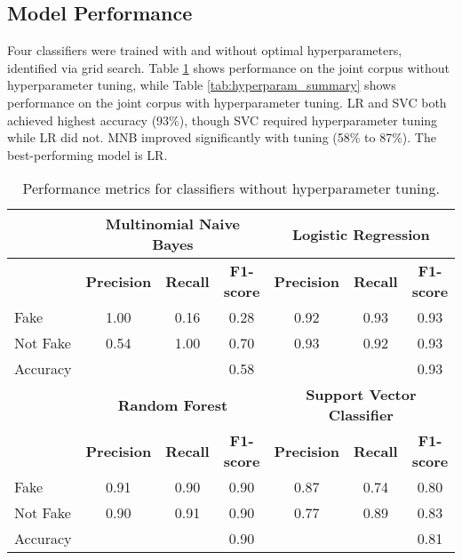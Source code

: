 \documentclass[conference]{IEEEtran}
\begin{document}
\subsection{Model Performance}
Four classifiers were trained with and without optimal hyperparameters, identified via grid search. Table \ref{tab:no_hyperparam_summary} shows performance on the joint corpus without hyperparameter tuning, while Table \ref{tab:hyperparam_summary} shows performance on the joint corpus with hyperparameter tuning. LR and SVC both achieved highest accuracy (93\%), though SVC required hyperparameter tuning while LR did not. MNB improved significantly with tuning (58\% to 87\%). The best-performing model is LR.

\begin{table}[!t]
\caption{Performance metrics for classifiers without hyperparameter tuning.}
\label{tab:no_hyperparam_summary}
\begin{center}
\begin{tabular}{|l|ccc|ccc|}
\hline
& \multicolumn{3}{c|}{\textbf{Multinomial Naive Bayes}} & \multicolumn{3}{c|}{\textbf{Logistic Regression}} \\
\hline
& \textbf{Precision} & \textbf{Recall} & \textbf{F1-score} & \textbf{Precision} & \textbf{Recall} & \textbf{F1-score} \\
\hline
Fake & 1.00 & 0.16 & 0.28 & 0.92 & 0.93 & 0.93 \\
Not Fake & 0.54 & 1.00 & 0.70 & 0.93 & 0.92 & 0.93 \\
Accuracy & & & 0.58 & & & 0.93 \\
\hline
& \multicolumn{3}{c|}{\textbf{Random Forest}} & \multicolumn{3}{c|}{\textbf{Support Vector Classifier}} \\
\hline
& \textbf{Precision} & \textbf{Recall} & \textbf{F1-score} & \textbf{Precision} & \textbf{Recall} & \textbf{F1-score} \\
\hline
Fake & 0.91 & 0.90 & 0.90 & 0.87 & 0.74 & 0.80 \\
Not Fake & 0.90 & 0.91 & 0.90 & 0.77 & 0.89 & 0.83 \\
Accuracy & & & 0.90 & & & 0.81 \\
\hline
\end{tabular}
\end{center}
\end{table}
\end{document}
